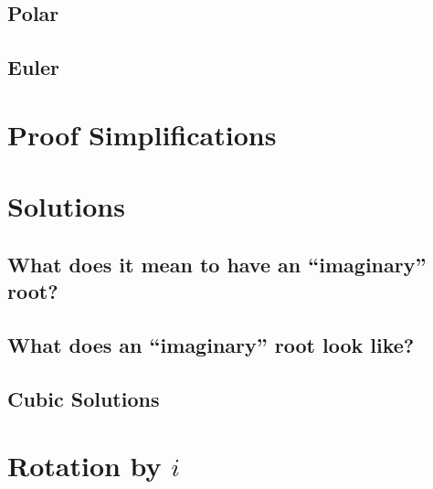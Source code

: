 \documentclass[10pt]{article}
\begin{document}
\subsection*{Polar}
\label{subsec:polar}

\subsection*{Euler}
\label{subsec:euler}

\section*{Proof Simplifications}
\label{sec:pf}

\section*{Solutions}
\label{sec:sol}


\subsection*{What does it mean to have an ``imaginary'' root?}
\label{subsec:root}


\subsection*{What does an ``imaginary'' root look like?}
\label{subsec:look}


\subsection*{Cubic Solutions}
\label{subsec:cubic}

\section*{Rotation by $i$}
\label{sec:rot}
\end{document}

